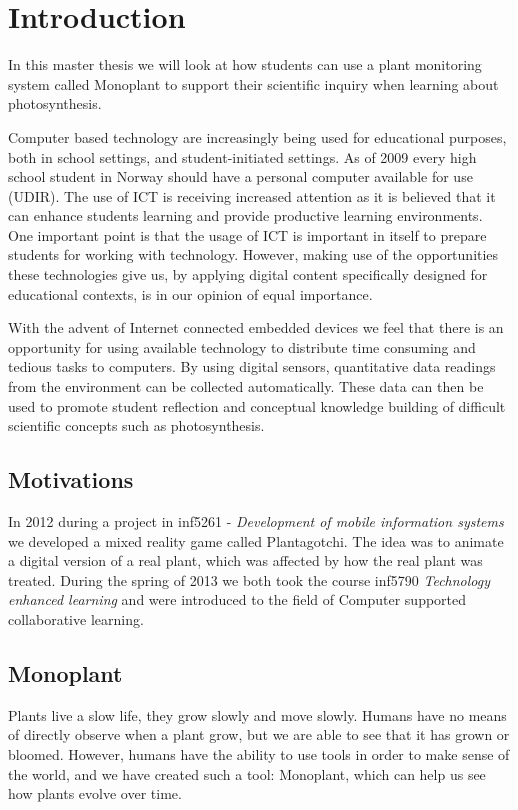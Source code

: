 \chapter{Introduction}
In this master thesis we will look at how students can use a plant monitoring system called Monoplant to support their scientific inquiry when learning about photosynthesis.

Computer based technology are increasingly being used for educational purposes, both in school settings, and student-initiated settings. As of 2009 every high school student in Norway should have a personal computer available for use (UDIR). The use of ICT is receiving increased attention as it is believed that it can enhance students learning and provide productive learning environments. One important point is that the usage of ICT is important in itself to prepare students for working with technology. However, making use of the opportunities these technologies give us, by applying digital content specifically designed for educational contexts, is in our opinion of equal importance. 

With the advent of Internet connected embedded devices we feel that there is an opportunity for using available technology to distribute time consuming and tedious tasks to computers. By using digital sensors, quantitative data readings from the environment can be collected automatically. These data can then be used to promote student reflection and conceptual knowledge building of difficult scientific concepts such as photosynthesis. 

\section{Motivations}
In 2012 during a project in inf5261 - \emph{Development of mobile information systems} we developed a mixed reality game called Plantagotchi. The idea was to animate a digital version of a real plant, which was affected by how the real plant was treated. 
During the spring of 2013 we both took the course inf5790 \emph{Technology enhanced learning} and were introduced to the field of Computer supported collaborative learning.


\section{Monoplant}
Plants live a slow life, they grow slowly and move slowly. Humans have no means of directly observe when a plant grow, but we are able to see that it has grown or bloomed. However, humans have the ability to use tools in order to make sense of the world, and we have created such a tool: Monoplant, which can help us see how plants evolve over time.

